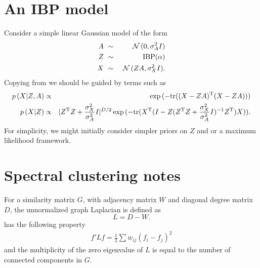 \documentclass{article}
\numberwithin{equation}{section}
\numberwithin{thm}{section}
\def\IBP{Z}
\def\Weights{A}
\def\Data{X}
\def\Graph{G}
\def\Adjacency{W}
\def\Degree{D}
\def\Laplacian{L}
\def\IBPPrior{\alpha}
\begin{document}
\section{An IBP model}

Consider a simple linear Gaussian model of the form
\begin{eqnarray}
\Weights & \dist & \Normal\,(0, \sigma_\Weights^2 I) \\
\IBP & \dist & \textrm{IBP}(\IBPPrior) \\
\Data & \dist & \Normal\,(\IBP \Weights, \sigma_\Data^2 I).
\end{eqnarray}
Copying from \cite{Griffiths2011} we should be guided by terms such as
\begin{eqnarray}
p\,(\Data | \IBP, \Weights) & \propto & \exp\,(-\textrm{tr}((\Data - \IBP\Weights)\Transpose(\Data - \IBP\Weights))) \\
p\,(\Data | \IBP) & \propto & |\IBP\Transpose\IBP + \frac{\sigma_\Data^2}{\sigma_\Weights^2}I|^{D/2} \exp\,(-\textrm{tr}(\Data\Transpose(I - \IBP(\IBP\Transpose\IBP + \frac{\sigma_\Data^2}{\sigma_\Weights^2}I)^{-1}\IBP\Transpose)\Data)).
\end{eqnarray}
For simplicity, we might initially consider simpler priors on $\IBP$ and or a maximum likelihood framework.

\section{Spectral clustering notes}

For a similarity matrix $\Graph$, with adjacency matrix $\Adjacency$ and diagonal degree matrix $\Degree$, the unnormalized graph Laplacian is defined as
\begin{equation}
\Laplacian = \Degree - \Adjacency.
\end{equation}
has the following property \citep{Luxburg2007}
\begin{eqnarray}
f' \Laplacian f = \frac{1}{2}\sum w_{ij}(f_i - f_j)^2
\end{eqnarray}
and the multiplicity of the zero eigenvalue of $\Laplacian$ is equal to the number of connected components in $\Graph$.
\end{document}
